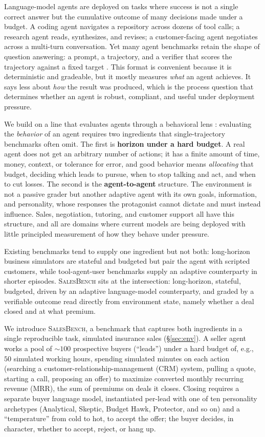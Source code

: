 \documentclass{article} %
\newcommand{\salesbench}{\textsc{SalesBench}}
\begin{document}
Language-model agents are deployed on tasks where success is not a single correct answer
but the cumulative outcome of many decisions made under a budget. A coding agent navigates
a repository across dozens of tool calls; a research agent reads, synthesizes, and revises;
a customer-facing agent negotiates across a multi-turn conversation. Yet many agent
benchmarks retain the shape of question answering: a prompt, a trajectory, and a verifier
that scores the trajectory against a fixed target \citep{liu2024agentbench, mialon2024gaia}.
This format is convenient because it is deterministic and gradeable, but it mostly measures
\emph{what} an agent achieves. It says less about \emph{how} the result was produced, which is
the process question that determines whether an agent is robust, compliant, and useful under
deployment pressure.

We build on a line that evaluates agents through a behavioral lens
\citep{park2023generative, zhou2024sotopia, pan2023machiavelli}: evaluating the
\emph{behavior} of an agent requires two ingredients that single-trajectory benchmarks often omit.
The first is \textbf{horizon under a hard budget}. A real agent does not get an arbitrary
number of actions; it has a finite amount of time, money, context, or tolerance for error,
and good behavior means \emph{allocating} that budget, deciding which leads to pursue, when
to stop talking and act, and when to cut losses. The second is the \textbf{agent-to-agent}
structure. The environment is not a passive grader but another adaptive agent with its own
goals, information, and personality, whose responses the protagonist cannot dictate and must
instead influence. Sales, negotiation, tutoring, and customer support all have this structure,
and all are domains where current models are being deployed with little principled measurement
of how they behave under pressure.

Existing benchmarks tend to supply one ingredient but not both: long-horizon business simulators are stateful and
budgeted but pair the agent with scripted customers, while tool-agent-user benchmarks supply an adaptive
counterparty in shorter episodes. \salesbench{} sits at the intersection: long-horizon, stateful, budgeted,
driven by an adaptive language-model counterparty, and graded by a verifiable outcome read directly from
environment state, namely whether a deal closed and at what premium.

We introduce \salesbench{}, a benchmark that captures both ingredients in a single reproducible task, simulated
insurance sales (\S\ref{sec:env}). A seller agent works a pool of ${\sim}100$ prospective buyers (``leads'') under a
hard budget of, e.g., $50$ simulated working hours, spending simulated minutes on each action (searching a
customer-relationship-management (CRM) system, pulling a quote, starting a call, proposing an offer) to maximize
converted monthly recurring revenue (MRR), the sum of premiums on deals it closes. Closing requires a separate buyer
language model, instantiated per-lead with one of ten personality archetypes (Analytical, Skeptic, Budget Hawk,
Protector, and so on) and a ``temperature'' from cold to hot, to accept the offer; the buyer decides, in character,
whether to accept, reject, or hang up.
\end{document}
